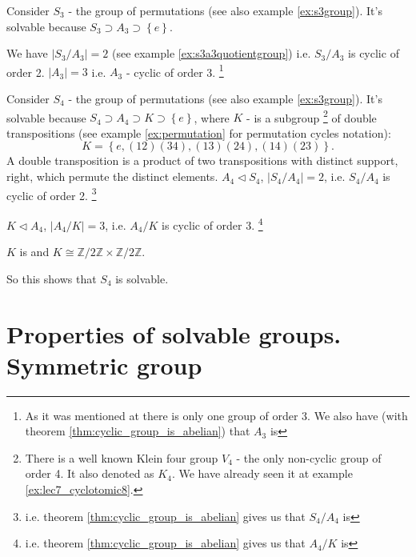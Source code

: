 \begin{example}
  Consider $S_3$ - the group of permutations (see also example
  \ref{ex:s3group}). It's solvable because 
  $S_3 \supset A_3 \supset \left\{e\right\}$.

  We have $\left|S_3/A_3\right| = 2$ (see example
  \ref{ex:s3a3quotientgroup}) i.e. $S_3/A_3$ is cyclic of order 
  2. $\left|A_3\right| = 3$ i.e. $A_3$ - cyclic of order 3.
  \footnote{
    As it was mentioned at \cite{wiki:finitegroup} there is only one
    group of order 3. We also have (with theorem
    \ref{thm:cyclic_group_is_abelian}) that $A_3$ is
  }
  \label{ex:lec8_s3}
\end{example}

\begin{example}
  Consider $S_4$ - the group of permutations (see also example
  \ref{ex:s3group}). It's solvable because 
  $S_4 \supset A_4 \supset K \supset \left\{e\right\}$, where $K$ -
  is a subgroup
  \footnote{
    There is a well known Klein four group $V_4$ \cite{wiki:klein4group} -
    the only non-cyclic group of order 4. It also denoted as $K_4$. We
    have already seen it at example \ref{ex:lec7_cyclotomic8}.
  }
  of double transpositions
  (see example
  \ref{ex:permutation} for permutation cycles notation):
  \[
  K = \left\{
  e, (12)(34), (13)(24), (14)(23)
  \right\}.
  \]
  A double transposition is a product of two transpositions with
  distinct support, right, which permute the distinct elements.
  $A_4 \triangleleft S_4$, $\left|S_4/A_4\right| = 2$, i.e.
  $S_4/A_4$ is cyclic of order 2.
  \footnote{
    i.e. theorem
    \ref{thm:cyclic_group_is_abelian} gives us that $S_4/A_4$ is
  }

  $K \triangleleft A_4$, $\left|A_4/K\right| = 3$, i.e.
  $A_4/K$ is cyclic of order 3.
  \footnote{
    i.e. theorem
    \ref{thm:cyclic_group_is_abelian} gives us that $A_4/K$ is
  }
  
  $K$ is  and
  $K \cong \mathbb{Z}/2\mathbb{Z} \times \mathbb{Z}/2 \mathbb{Z}$.

  So this shows that $S_4$ is solvable.
  \label{ex:lec8_s4}
\end{example}

\section{Properties of solvable groups. Symmetric group}

